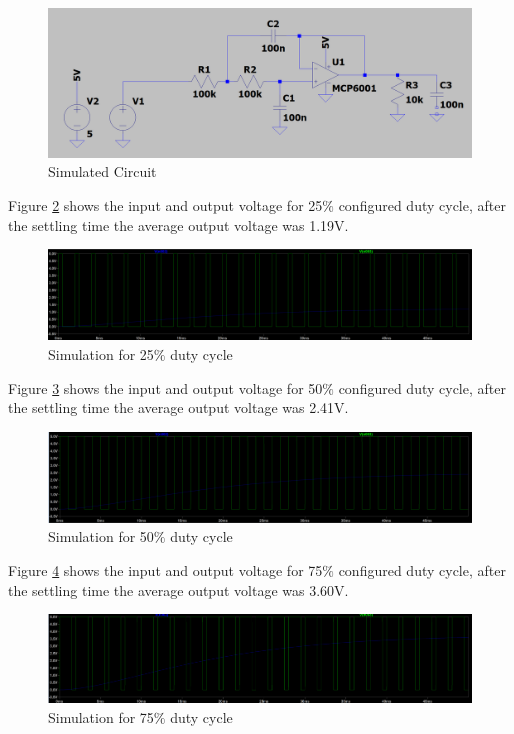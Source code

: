 		\begin{figure}[htbp]
			\centering
			\includegraphics[width=.8\textwidth]{figuras/fig-sim}
			\caption{Simulated Circuit}
			\label{fig:sim}
		\end{figure}

		Figure \ref{fig:sim-dt-25} shows the input and output voltage for 25$\%$ configured duty cycle, after the settling time the average output voltage was 1.19V.

		\begin{figure}[htbp]
			\centering
			\includegraphics[width=1\textwidth]{figuras/fig-sim-dt-25}
			\caption{Simulation for 25$\%$ duty cycle}
			\label{fig:sim-dt-25}
		\end{figure}

		Figure \ref{fig:sim-dt-50} shows the input and output voltage for 50$\%$ configured duty cycle, after the settling time the average output voltage was 2.41V.

		\begin{figure}[htbp]
			\centering
			\includegraphics[width=1\textwidth]{figuras/fig-sim-dt-50}
			\caption{Simulation for 50$\%$ duty cycle}
			\label{fig:sim-dt-50}
		\end{figure}

		Figure \ref{fig:sim-dt-75} shows the input and output voltage for 75$\%$ configured duty cycle, after the settling time the average output voltage was 3.60V.

		\begin{figure}[htbp]
			\centering
			\includegraphics[width=1\textwidth]{figuras/fig-sim-dt-75}
			\caption{Simulation for 75$\%$ duty cycle}
			\label{fig:sim-dt-75}
		\end{figure}

